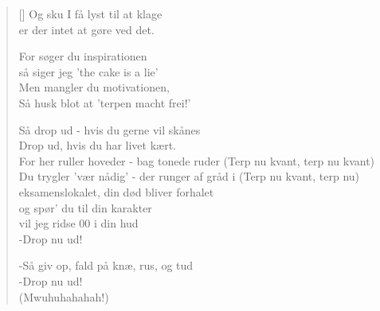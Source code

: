 \begin{multicols}{2}
\begin{verse}[\versewidth]
Og sku I få lyst til at klage\\
er der intet at gøre ved det.

For søger du inspirationen\\
så siger jeg 'the cake is a lie'\\
Men mangler du motivationen,\\
Så husk blot at 'terpen macht frei!'

Så drop ud - hvis du gerne vil skånes\\
Drop ud, hvis du har livet kært.\\
For her ruller hoveder - bag tonede ruder (Terp nu kvant, terp nu kvant)\\
Du trygler 'vær nådig' - der runger af gråd i (Terp nu kvant, terp nu)\\
eksamenslokalet, din død bliver forhalet\\
og spør' du til din karakter\\
vil jeg ridse 00 i din hud\\
-Drop nu ud!

-Så giv op, fald på knæ, rus, og tud\\
-Drop nu ud!\\
(Mwuhuhahahah!)
\end{verse}
\end{multicols}
\newpage

